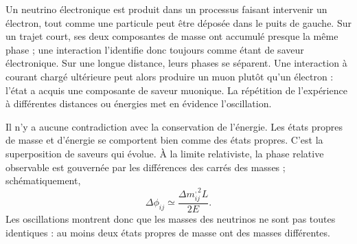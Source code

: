 Un neutrino électronique est produit dans un processus faisant intervenir un électron, tout comme une particule peut être déposée dans le puits de gauche. Sur un trajet court, ses deux composantes de masse ont accumulé presque la même phase ; une interaction l’identifie donc toujours comme étant de saveur électronique. Sur une longue distance, leurs phases se séparent. Une interaction à courant chargé ultérieure peut alors produire un muon plutôt qu’un électron : l’état a acquis une composante de saveur muonique. La répétition de l’expérience à différentes distances ou énergies met en évidence l’oscillation.

Il n’y a aucune contradiction avec la conservation de l’énergie. Les états propres de masse et d’énergie se comportent bien comme des états propres. C’est la superposition de saveurs qui évolue. À la limite relativiste, la phase relative observable est gouvernée par les différences des carrés des masses ; schématiquement, \begin{equation}
\Delta\phi_{ij}\simeq \frac{\Delta m_{ij}^{,2}L}{2E}.
\end{equation}Les oscillations montrent donc que les masses des neutrinos ne sont pas toutes identiques : au moins deux états propres de masse ont des masses différentes.

\begin{classroomqa}\end{classroomqa}

\begin{classroomqa}\end{classroomqa}

\begin{classroomqa}\end{classroomqa}


